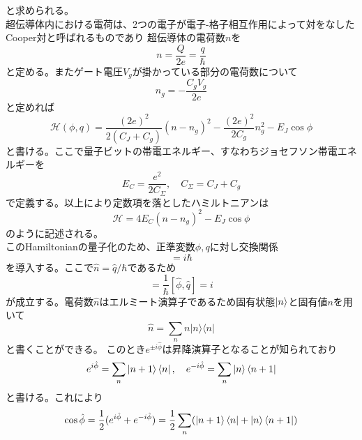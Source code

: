         と求められる。\\
        超伝導体内における電荷は、2つの電子が電子-格子相互作用によって対をなしたCooper対と呼ばれるものであり
        超伝導体の電荷数$n$を
        \begin{equation}n=\frac{Q}{2 e}=\frac{q}{\hbar}\end{equation}
        と定める。またゲート電圧$V_g$が掛かっている部分の電荷数について
        \begin{equation}n_{g}=-\frac{C_{g} V_{g}}{2 e}\end{equation}
        と定めれば
        \begin{equation}\mathcal{H}(\phi, q)=\frac{(2 e)^{2}}{2\left(C_{J}+C_{g}\right)}\left(n-n_{g}\right)^{2}-\frac{(2 e)^{2}}{2 C_{g}} n_g^{2}-E_{J} \cos \phi\end{equation}
        と書ける。ここで量子ビットの帯電エネルギー、すなわちジョセフソン帯電エネルギーを
        \begin{equation}E_{C}=\frac{e^{2}}{2 C_{\Sigma}}, \quad C_{\Sigma}=C_{J}+C_{g}\end{equation}
        で定義する。以上により定数項を落としたハミルトニアンは
        \begin{equation}\mathcal{H}=4 E_{C}\left(n-n_{g}\right)^{2}-E_{J} \cos \phi\end{equation}
        のように記述される。\\
        このHamiltonianの量子化のため、正準変数$\phi,q$に対し交換関係
        \begin{equation}[\hat{\phi}, \hat{q}]=i \hbar\end{equation}
        を導入する。ここで$\hat{n}=\hat{q} / \hbar$であるため
        \begin{equation}[\hat{\phi}, \hat{n}]=\frac{1}{\hbar}[\hat{\phi}, \hat{q}]=i\end{equation}
        が成立する。電荷数$\hat{n}$はエルミート演算子であるため固有状態$\ket{n}$と固有値$n$を用いて
        \begin{equation}\hat{n}=\sum_{n} n|n\rangle\langle n|\end{equation}
        と書くことができる。
        このとき$e^{\pm i \hat{\phi}}$は昇降演算子となることが知られており
        \begin{equation}e^{i \hat{\phi}}=\sum_{n}\ket{n+1}\bra{n}, \quad e^{-i \hat{\phi}}=\sum_{n}\ket{n}\bra{n+1}\end{equation}
        と書ける。これにより
        \begin{equation}
            \cos \hat{\phi} = \frac{1}{2}(e^{i \hat{\phi}}+e^{-i \hat{\phi}})=\frac{1}{2}\sum_{n}(\ket{n+1}\bra{n}+\ket{n}\bra{n+1})
        \end{equation}
